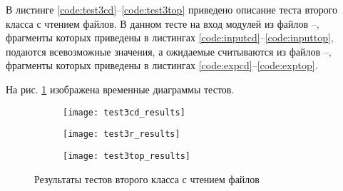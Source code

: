 В листинге \ref{code:test3cd}--\ref{code:test3top} приведено описание теста второго класса с чтением файлов. В данном тесте на вход модулей из файлов --, фрагменты которых приведены в листингах \ref{code:inputcd}--\ref{code:inputtop}, подаются всевозможные значения, а ожидаемые считываются из файлов --, фрагменты которых приведены в листингах \ref{code:expcd}--\ref{code:exptop}.



\begin{multicols}{2}
		
		
	
	
	
\end{multicols}
\begin{multicols}{2}
		
	
	
\end{multicols}

На рис. \ref{fig:test3_results} изображена временные диаграммы тестов.
\begin{figure}[H]
	\begin{subfigure}{\textwidth}
		\centering
		\texttt{[image: test3cd\_results]}
		\vspace{0.1cm}
	\end{subfigure}
	\begin{subfigure}{\textwidth}
		\centering
		\texttt{[image: test3r\_results]}
		\vspace{0.1cm}
	\end{subfigure}
	\begin{subfigure}{\textwidth}
		\centering
		\texttt{[image: test3top\_results]}
	\end{subfigure}
	\caption{Результаты тестов второго класса с чтением файлов}
	\label{fig:test3_results}
\end{figure}

